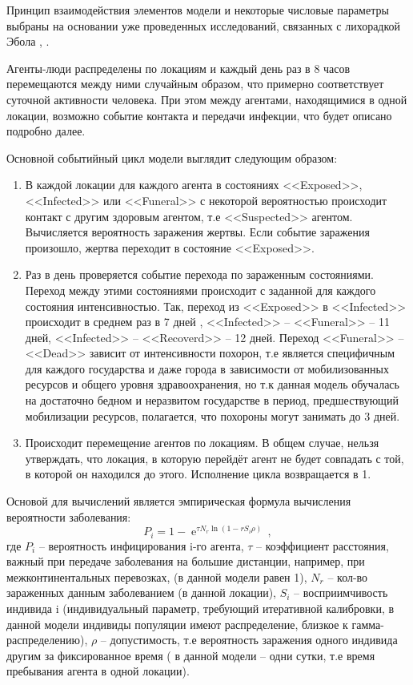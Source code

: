 Принцип взаимодействия элементов модели и некоторые числовые параметры выбраны на основании уже проведенных исследований, связанных с лихорадкой Эбола
\cite{Plos_Outbreak:1}, \cite{Plos_Outbreak:2}. 

Агенты-люди распределены по локациям и каждый день раз в 8 часов перемещаются между ними случайным образом, что примерно соответствует суточной активности  человека. При этом между агентами, находящимися в одной локации, возможно событие контакта  и передачи инфекции, что будет описано подробно далее. 

Основной событийный цикл модели выглядит следующим образом:
\begin{enumerate}
	\item В каждой локации для каждого агента в состояниях <<Exposed>>, <<Infected>> или <<Funeral>>  с некоторой вероятностью происходит контакт с другим   здоровым агентом, т.е <<Suspected>> агентом. Вычисляется вероятность заражения жертвы. Если событие заражения произошло, жертва переходит в состояние <<Exposed>>.
	\item Раз в день проверяется событие перехода по зараженным состояниями. Переход между этими состояниями происходит с заданной для каждого состояния интенсивностью. Так, переход из <<Exposed>> в <<Infected>> происходит в среднем раз в 7 дней %
	\cite{ncbi:2014} ,  <<Infected>> -- <<Funeral>> -- 11 дней, <<Infected>> -- <<Recoverd>> -- 12 дней. Переход <<Funeral>> -- <<Dead>> зависит от интенсивности похорон, т.е является специфичным для каждого государства и даже города в зависимости от мобилизованных ресурсов и общего уровня здравоохранения, но т.к данная модель обучалась на достаточно бедном и неразвитом государстве в период, предшествующий мобилизации ресурсов, полагается, что похороны могут занимать до 3 дней. 
	\item Происходит перемещение агентов по локациям. В общем случае, нельзя утверждать, что локация, в которую перейдёт агент не будет совпадать с той, в которой он находился до этого. Исполнение цикла возвращается в 1. 
\end{enumerate}

Основой для вычислений является эмпирическая формула  вычисления вероятности заболевания:
\begin{equation}\label{stohastic_eq:1}
P_i = 1 - \operatorname{e}^{\tau N_r \ln(1-rS_i\rho)} \,,
\end{equation}
где $P_i$ -- вероятность инфицирования  i-го агента, $\tau$  -- коэффициент расстояния, важный при передаче заболевания на большие дистанции, например, при межконтинентальных перевозках, (в данной модели равен 1), $N_r$ -- кол-во зараженных данным заболеванием (в данной локации), $S_i$ -- восприимчивость индивида i (индивидуальный параметр, требующий итеративной калибровки, в данной модели индивиды популяции имеют распределение, близкое к гамма-распределению), $\rho$ -- допустимость, т.е вероятность заражения одного индивида другим за фиксированное время ( в данной модели -- одни сутки, т.е время пребывания агента в одной локации).

